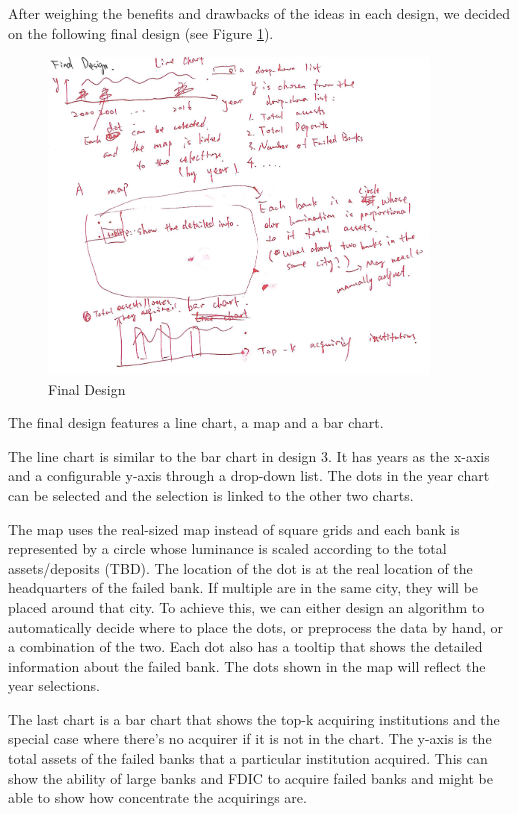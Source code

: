 \documentclass[11pt]{article}
\begin{document}
After weighing the benefits and drawbacks of the ideas in each design, we
decided on the following final design (see Figure \ref{fig:final_design}).

\begin{figure}[!h]
    \centering
    \includegraphics[width=0.9\textwidth]{fig/final_design}
    \caption{Final Design}
    \label{fig:final_design}
\end{figure}

The final design features a line chart, a map and a bar chart.

The line chart is similar to the bar chart in design 3. It has years as the
x-axis and a configurable y-axis through a drop-down list. The dots in the
year chart can be selected and the selection is linked to the other two
charts.

The map uses the real-sized map instead of square grids and each bank is
represented by a circle whose luminance is scaled according to the total
assets/deposits (TBD). The location of the dot is at the real location of the
headquarters of the failed bank. If multiple are in the same city, they will
be placed around that city. To achieve this, we can either design an algorithm
to automatically decide where to place the dots, or preprocess the data by
hand, or a combination of the two. Each dot also has a tooltip that shows the
detailed information about the failed bank. The dots shown in the map will
reflect the year selections.

The last chart is a bar chart that shows the top-k acquiring institutions and
the special case where there's no acquirer if it is not in the chart. The
y-axis is the total assets of the failed banks that a particular institution
acquired. This can show the ability of large banks and FDIC to acquire failed
banks and might be able to show how concentrate the acquirings are.
\end{document}
